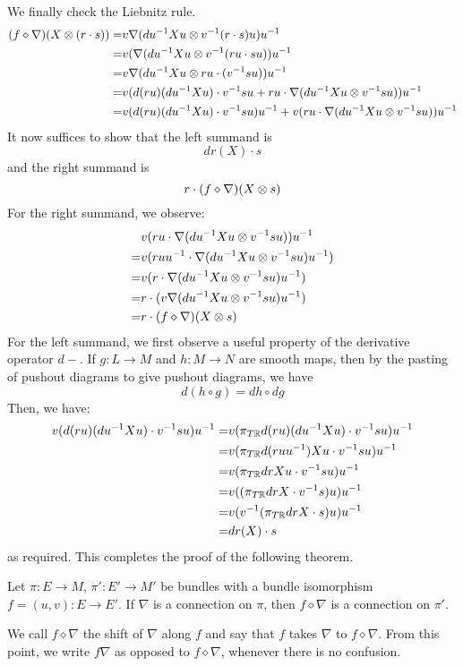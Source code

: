 \documentclass[./Thick_TQFTs_and_Quantum_Information.tex]{subfiles}
\begin{document}
We finally check the Liebnitz rule.
\begin{align*}
(f \diamond \nabla)(X \otimes (r \cdot s))
=& v\nabla(du^{-1}Xu \otimes v^{-1}(r \cdot s)u)u^{-1} \\
=& v(\nabla(du^{-1}Xu \otimes v^{-1}(ru \cdot su))u^{-1} \\
=& v\nabla(du^{-1}Xu \otimes ru \cdot (v^{-1}su))u^{-1} \\
=& v(
      d(ru)(du^{-1}Xu) \cdot v^{-1}su
      + ru \cdot \nabla(du^{-1}Xu \otimes v^{-1}su)
    )u^{-1} \\
=& v(d(ru)(du^{-1}Xu) \cdot v^{-1}su)u^{-1}
 + v(ru \cdot \nabla(du^{-1}Xu \otimes v^{-1}su))u^{-1}
\end{align*}
It now suffices to show that the left summand is
\[
  dr(X) \cdot s
\]
and the right summand is
\[
  r \cdot (f \diamond \nabla)(X \otimes s)
\]
For the right summand, we observe:
\begin{align*}
 & v(ru \cdot \nabla(du^{-1}Xu \otimes v^{-1}su))u^{-1} \\
=& v(ruu^{-1} \cdot \nabla(du^{-1}Xu \otimes v^{-1}su)u^{-1}) \\
=& v(r \cdot \nabla(du^{-1}Xu \otimes v^{-1}su)u^{-1}) \\
=&r \cdot (v\nabla(du^{-1}Xu \otimes v^{-1}su)u^{-1}) \\
=& r \cdot (f \diamond \nabla)(X \otimes s)
\end{align*}
For the left summand, we first observe a useful property of the derivative
operator $d-$. If $g : L \to M$ and $h : M \to N$ are smooth maps, then by the
pasting of pushout diagrams to give pushout diagrams, we have
\[
  d(h \circ g) = dh \circ dg
\]
Then, we have:
\begin{align*}
v(d(ru)(du^{-1}Xu) \cdot v^{-1}su)u^{-1}
=& v(\pi_{T\mathbb{R}}d(ru)(du^{-1}Xu) \cdot v^{-1}su)u^{-1}\\
=& v(\pi_{T\mathbb{R}}d(ruu^{-1})Xu \cdot v^{-1}su)u^{-1}\\
=& v(\pi_{T\mathbb{R}}drXu \cdot v^{-1}su)u^{-1}\\
=& v((\pi_{T\mathbb{R}}drX \cdot v^{-1}s)u)u^{-1}\\
=& v(v^{-1}(\pi_{T\mathbb{R}}drX \cdot s)u)u^{-1}\\
=& dr(X) \cdot s
\end{align*}
as required. This completes the proof of the following theorem.
\begin{thm}
Let $\pi : E \to M$, $\pi' : E' \to M'$ be bundles with a bundle isomorphism
$f = (u, v) : E \to E'$. If $\nabla$ is a connection on $\pi$, then
$f \diamond \nabla$ is a connection on $\pi'$.
\end{thm}
\begin{defn}
We call $f \diamond \nabla$ the shift of $\nabla$ along $f$ and say that $f$
takes $\nabla$ to $f \diamond \nabla$. From this point, we write $f\nabla$ as
opposed to $f \diamond \nabla$, whenever there is no confusion.
\end{defn}
\end{document}
